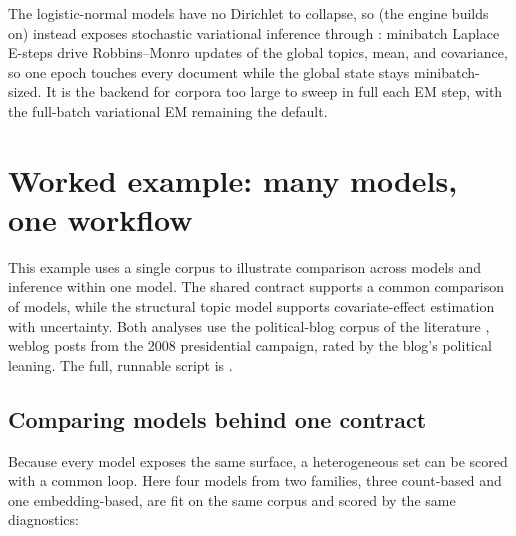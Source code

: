 \documentclass[article]{jss}
\begin{document}
The logistic-normal models have no Dirichlet to collapse, so  (the
engine  builds on) instead exposes stochastic variational inference
\citep{hoffman2013svi} through : minibatch Laplace
E-steps drive Robbins--Monro updates of the global topics, mean, and
covariance, so one epoch touches every document while the global state stays
minibatch-sized. It is the backend for corpora too large to sweep in full
each EM step, with the full-batch variational EM remaining the default.

\section{Worked example: many models, one workflow}\label{sec:example}

This example uses a single corpus to illustrate comparison across models and
inference within one model. The shared contract supports a common comparison of
models, while the structural topic model supports covariate-effect estimation
with uncertainty. Both analyses use the political-blog corpus of the 
literature \citep{roberts2016model}, weblog posts from the 2008 
presidential campaign, rated by the blog's political leaning. The full, runnable
script is .

\subsection{Comparing models behind one contract}

Because every model exposes the same surface, a heterogeneous set can be scored
with a common loop. Here four models from two families, three
count-based and one embedding-based, are fit on the same corpus and scored by the
same diagnostics:
\end{document}
